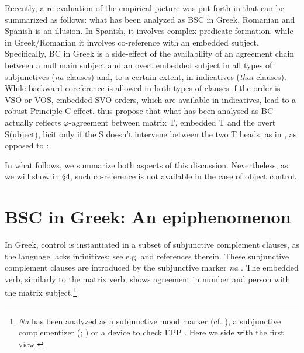 \documentclass[output=paper]{langsci/langscibook}
\begin{document}
Recently, a re-evaluation of the empirical picture was put forth in \citet{Tsakali2017} that can be summarized as follows: what has been analyzed as BSC in Greek, Romanian and Spanish is an illusion. In Spanish, it involves complex predicate formation, while in Greek\slash Romanian it involves co-reference with an embedded subject. Specifically, BC in Greek is a side-effect of the availability of an agreement chain between a null main subject and an overt embedded subject in all types of subjunctives (\textit{na}{}-clauses) and, to a certain extent, in indicatives (\textit{that}{}-clauses). While backward coreference is allowed in both types of clauses if the order is VSO or VOS, embedded SVO orders, which are available in indicatives, lead to a robust Principle C effect. \citet{Tsakali2017} thus propose that what has been analysed as BC actually reflects $\varphi ${}-agreement between matrix T, embedded T and the overt S(ubject), licit only if the S doesn’t intervene between the two T heads, as in , as opposed to :

\ea%
    \label{ex:alexiadou:2}
    \z
\z    

In what follows, we summarize both aspects of this discussion. Nevertheless, as we will show in §4, such co-reference is not available in the case of object control.

\section{BSC in Greek: An epiphenomenon}%

In Greek, control is instantiated in a subset of subjunctive complement clauses, as the language lacks infinitives; see e.g. \citet{Varlokosta1994} and references therein. These subjunctive complement clauses are introduced by the subjunctive marker \textit{na} . The embedded verb, similarly to the matrix verb, shows agreement in number and person with the matrix subject.\footnote{\textit{Na} has been analyzed as a subjunctive mood marker (cf. \citealt{Philippaki-Warburton1984}), a subjunctive complementizer (\citealt{Agouraki1991}; \citealt{Tsoulas1993}) or a device to check EPP \citep{Roussou2009}. Here we side with the first view.} 
\end{document}
